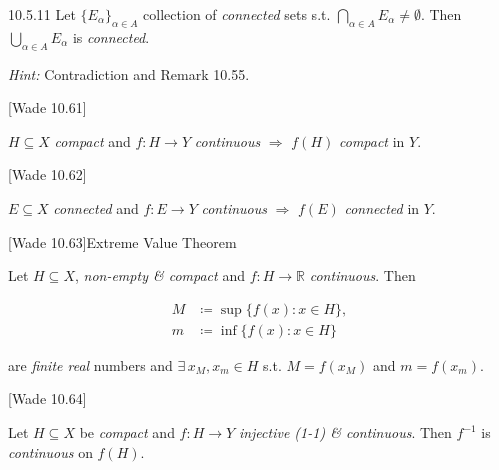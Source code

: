 \documentclass[10pt]{article} %
\newcommand{\cw}[1]{[Wade #1]}
\newcommand{\Hint}{\vspace{0.2em}\textit{Hint: }}
\begin{document}
\begin{multicols}{3}
\begin{exercise}{10.5.11}{}
    Let $\{E_{\alpha}\}_{\alpha \in A}$ collection of \emph{connected} sets s.t. $\bigcap_{\alpha \in A} E_{\alpha} \neq \emptyset$. Then $\bigcup_{\alpha \in A} E_{\alpha}$ is \emph{connected}.

    \Hint Contradiction and Remark 10.55.

\end{exercise}

\begin{theorem}{\cw{10.61}}{}

    $H \subseteq X$ \emph{compact} and $f: H \to Y$ \emph{continuous} $\Rightarrow$ $f(H)$ \emph{compact} in $Y$.

\end{theorem}

\begin{theorem}{\cw{10.62}}{}

    $E \subseteq X$ \emph{connected} and $f: E \to Y$ \emph{continuous} $\Rightarrow$ $f(E)$ \emph{connected} in $Y$.

\end{theorem}

\begin{theorem}{\cw{10.63}}{Extreme Value Theorem}

    Let $H \subseteq X$, \emph{non-empty \& compact} and $f: H \to \mathbb{R}$ \emph{continuous}. Then

        \begin{align*}
            M &\coloneqq \sup\{f(x) : x \in H\}, \\
            m &\coloneqq \inf\{f(x) : x \in H\}
        \end{align*}

    are \emph{finite real} numbers and $\exists \, x_M,x_m \in H$ s.t. $M = f(x_M)$ and $m = f(x_m)$.

\end{theorem}

\begin{theorem}{\cw{10.64}}{}

    Let $H \subseteq X$ be \emph{compact} and $f: H \to Y$ \emph{injective (1-1) \& continuous}. Then $f^{-1}$ is \emph{continuous} on $f(H)$.

\end{theorem}


\end{multicols}
\end{document}
